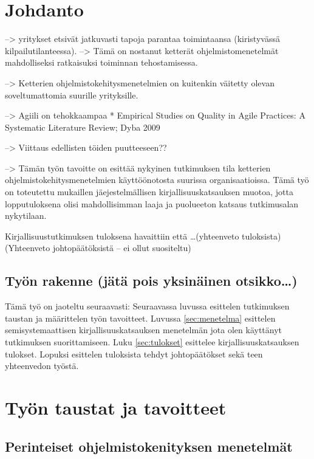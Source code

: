 
\section{Johdanto}

--> yritykset etsivät jatkuvasti tapoja parantaa toimintaansa (kiristyvässä
kilpailutilanteessa). --> Tämä on nostanut ketterät ohjelmistomenetelmät
mahdolliseksi ratkaisuksi toiminnan tehostamisessa.

--> Ketterien ohjelmistokehitysmenetelmien on kuitenkin väitetty olevan
soveltumattomia suurille yrityksille.

--> Agiili on tehokkaampaa
  * Empirical Studies on Quality in Agile Practices: A Systematic Literature Review; Dyba 2009

--> Viittaus edellisten töiden puutteeseen??

--> Tämän työn tavoitte on esittää nykyinen tutkimuksen tila ketterien
ohjelmistokehitysmenetelmien käyttöönotosta suurissa organisaatioissa. Tämä työ
on toteutettu mukaillen jäejestelmällisen kirjallisuuskatsauksen muotoa, jotta
lopputuloksena olisi mahdollisimman laaja ja puolueeton katsaus tutkimusalan
nykytilaan.

Kirjallisuustutkimuksen tuloksena havaittiin että \ldots (yhteenveto tuloksista)
(Yhteenveto johtopäätöksistä -- ei ollut suositeltu)


\subsection{Työn rakenne (jätä pois yksinäinen otsikko\ldots)}

Tämä työ on jaoteltu seuraavasti:
Seuraavassa luvussa esittelen tutkimuksen taustan ja määrittelen työn
tavoitteet. Luvussa \ref{sec:menetelma} esittelen semisystemaattisen
kirjallisuuskatsauksen menetelmän jota olen käyttänyt tutkimuksen
suorittamiseen. Luku \ref{sec:tulokset} esittelee kirjallisuuskatsauksen
tulokset. Lopuksi esittelen tuloksista tehdyt johtopäätökset sekä teen
yhteenvedon työstä.



\section{Työn taustat ja tavoitteet}
\label{sec:tausta}

\subsection{Perinteiset ohjelmistokenityksen menetelmät}

